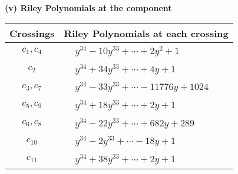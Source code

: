 \documentclass[1p]{elsarticle_modified}
\theoremstyle{definition}
\begin{document}
\newpage\renewcommand{\arraystretch}{1}
\flushleft \textbf{(v) Riley Polynomials at the component}\newline \\
\begin{tabular}{m{50pt}|m{274pt}}
Crossings & \hspace{64pt}Riley Polynomials at each crossing \\
\hline $$\begin{aligned}c_{1},c_{4}\end{aligned}$$&$\begin{aligned}
&y^{34}-10 y^{33}+\cdots+2 y^2+1
\end{aligned}$\\
\hline $$\begin{aligned}c_{2}\end{aligned}$$&$\begin{aligned}
&y^{34}+34 y^{33}+\cdots+4 y+1
\end{aligned}$\\
\hline $$\begin{aligned}c_{3},c_{7}\end{aligned}$$&$\begin{aligned}
&y^{34}-33 y^{33}+\cdots-11776 y+1024
\end{aligned}$\\
\hline $$\begin{aligned}c_{5},c_{9}\end{aligned}$$&$\begin{aligned}
&y^{34}+18 y^{33}+\cdots+2 y+1
\end{aligned}$\\
\hline $$\begin{aligned}c_{6},c_{8}\end{aligned}$$&$\begin{aligned}
&y^{34}-22 y^{33}+\cdots+682 y+289
\end{aligned}$\\
\hline $$\begin{aligned}c_{10}\end{aligned}$$&$\begin{aligned}
&y^{34}-2 y^{33}+\cdots-18 y+1
\end{aligned}$\\
\hline $$\begin{aligned}c_{11}\end{aligned}$$&$\begin{aligned}
&y^{34}+38 y^{33}+\cdots+2 y+1
\end{aligned}$\\
\hline
\end{tabular}\\~\\
\end{document}
